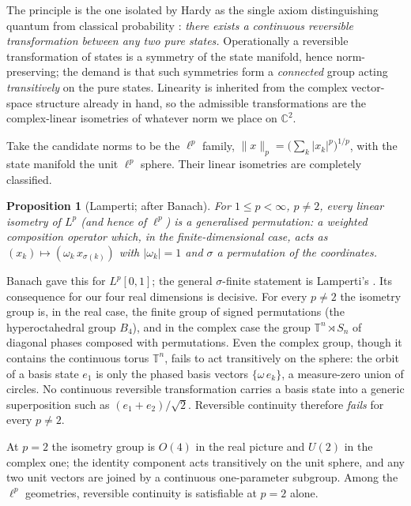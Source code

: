 \documentclass{article}
\newtheorem{proposition}{Proposition}
\begin{document}
The principle is the one isolated by Hardy as the single axiom distinguishing quantum from classical probability \autocite{Hardy2001a}: \emph{there exists a continuous reversible transformation between any two pure states.} Operationally a reversible transformation of states is a symmetry of the state manifold, hence norm-preserving; the demand is that such symmetries form a \emph{connected} group acting \emph{transitively} on the pure states. Linearity is inherited from the complex vector-space structure already in hand, so the admissible transformations are the complex-linear isometries of whatever norm we place on $\mathbb{C}^{2}$.

Take the candidate norms to be the $\ell^{p}$ family, $\lVert x\rVert_{p}=\bigl(\sum_{k}\lvert x_{k}\rvert^{p}\bigr)^{1/p}$, with the state manifold the unit $\ell^{p}$ sphere. Their linear isometries are completely classified.


\begin{proposition}[Lamperti; after Banach]
\label{prop:lamperti}
For $1\le p<\infty$, $p\neq 2$, every linear isometry of $L^{p}$ (and hence of $\ell^{p}$) is a generalised permutation: a weighted composition operator which, in the finite-dimensional case, acts as $(x_{k})\mapsto(\omega_{k}\,x_{\sigma(k)})$ with $\lvert\omega_{k}\rvert=1$ and $\sigma$ a permutation of the coordinates.
\end{proposition}

\noindent Banach gave this for $L^{p}[0,1]$; the general $\sigma$-finite
statement is Lamperti's \autocite{Banach1932, Lamperti1958}. Its consequence for
our four real dimensions is decisive. For every $p\neq 2$ the isometry group is,
in the real case, the finite group of signed permutations (the hyperoctahedral
group $B_{4}$), and in the complex case the group $\mathbb{T}^{n}\rtimes S_{n}$
of diagonal phases composed with permutations. Even the complex group, though it
contains the continuous torus $\mathbb{T}^{n}$, fails to act transitively on the
sphere: the orbit of a basis state $e_{1}$ is only the phased basis vectors
$\{\omega\,e_{k}\}$, a measure-zero union of circles. No continuous reversible
transformation carries a basis state into a generic superposition such as
$(e_{1}+e_{2})/\sqrt{2}$. Reversible continuity therefore \emph{fails} for every
$p\neq 2$.

At $p=2$ the isometry group is $O(4)$ in the real picture and $U(2)$ in the
complex one; the identity component acts transitively on the unit sphere, and any
two unit vectors are joined by a continuous one-parameter subgroup. Among the
$\ell^{p}$ geometries, reversible continuity is satisfiable at $p=2$ alone.
\end{document}
